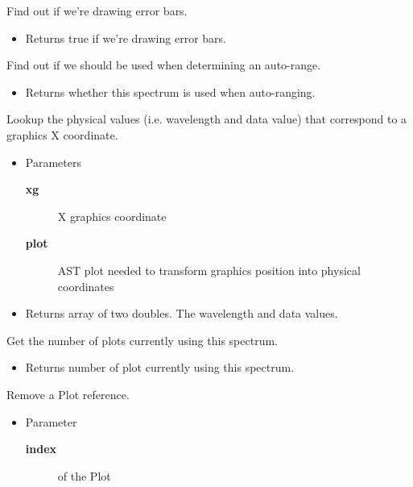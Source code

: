 \begin{desc}Find out if we're drawing error bars.
\begin{itemize}
\item{Returns true if we're drawing error bars. }
\end{itemize}
\end{desc}

\begin{desc}Find out if we should be used when determining an auto-range.
\begin{itemize}
\item{Returns whether this spectrum is used when auto-ranging. }
\end{itemize}
\end{desc}

\begin{desc}Lookup the physical values (i.e. wavelength and data value)
 that correspond to a graphics X coordinate.
\begin{itemize}
\item{Parameters
  \begin{description}
   \item[\textbf{xg}]{X graphics coordinate}
   \item[\textbf{plot}]{AST plot needed to transform graphics position
             into physical coordinates}
  \end{description}}
\end{itemize}
\begin{itemize}
\item{Returns array of two doubles. The wavelength and data values. }
\end{itemize}
\end{desc}

\begin{desc}Get the number of plots currently using this spectrum.
\begin{itemize}
\item{Returns number of plot currently using this spectrum. }
\end{itemize}
\end{desc}

\begin{desc}Remove a Plot reference.
\begin{itemize}
\item{Parameter
  \begin{description}
   \item[\textbf{index}]{of the Plot}
  \end{description}}
\end{itemize}
\end{desc}

